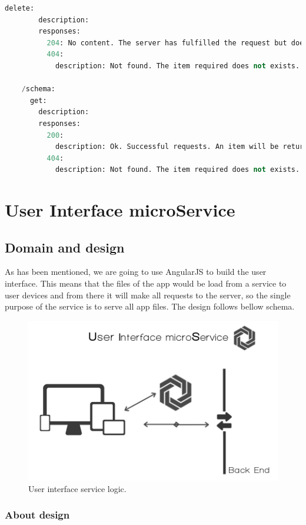 \begin{lstlisting}[language=python,frame=none]
      delete:
        description:
        responses:
          204: No content. The server has fulfilled the request but does not need to return an entity-body.
          404:
            description: Not found. The item required does not exists.

    /schema:
      get:
        description:
        responses:
          200:
            description: Ok. Successful requests. An item will be returned.
          404:
            description: Not found. The item required does not exists.

\end{lstlisting}

\section{User Interface microService}

\subsection{Domain and design}

As has been mentioned, we are going to use AngularJS to build the user interface.
This means that the files of the app would be load from a service to user devices
and from there it will make all requests to the server, so the single purpose of
the service is to serve all app files.
The design follows bellow schema.

\begin{figure}[H]
  \includegraphics[scale=0.4]{img/graphics/ui.png}
  \centering
  \caption{User interface service logic.}
\end{figure}


\subsubsection{About design}


